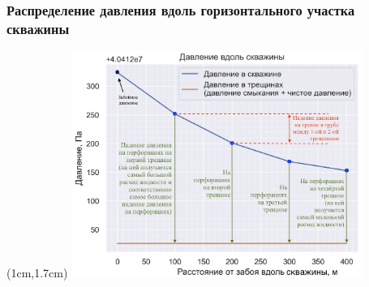 \documentclass{beamer}
\begin{document}
\begin{frame}
\frametitle{Распределение давления вдоль горизонтального участка скважины}

\begin{textblock*}{11cm}(1cm,1.7cm)
\includegraphics[width=9.5cm]{pressure_distribution.jpg}
\end{textblock*}

\end{frame}


\end{document}
